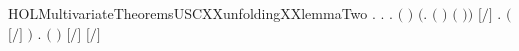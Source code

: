 \begin{SaveVerbatim}{HOLMultivariateTheoremsUSCXXunfoldingXXlemmaTwo}
\HOLTokenTurnstile{} \HOLSymConst{\HOLTokenForall{}}.
         \HOLSymConst{\HOLTokenImp{}}
       \HOLSymConst{\HOLTokenForall{}}.
              \HOLSymConst{\HOLTokenImp{}}
           \HOLSymConst{\HOLTokenForall{}}  .
               \ensuremath{(}  \HOLSymConst{\ensuremath{=}}  \ensuremath{)} \HOLSymConst{\HOLTokenConj{}}   \HOLSymConst{\HOLTokenConj{}}
                \ensuremath{(}\HOLTokenLambda{}.  \ensuremath{(} \ensuremath{)} \ensuremath{(} \ensuremath{)}\ensuremath{)}  \HOLSymConst{\HOLTokenConj{}}
               \ensuremath{[}\ensuremath{/}\ensuremath{]}  \HOLTokenTransBegin{}\HOLTokenTransEnd {} \HOLSymConst{\HOLTokenImp{}}
               \HOLSymConst{\HOLTokenExists{}}.
                      \HOLSymConst{\HOLTokenConj{}} \ensuremath{(} \HOLSymConst{\ensuremath{=}} \ensuremath{[}\ensuremath{/}\ensuremath{]} \ensuremath{)} \HOLSymConst{\HOLTokenConj{}}
                   \HOLSymConst{\HOLTokenForall{}}.
                       \ensuremath{(}  \HOLSymConst{\ensuremath{=}}  \ensuremath{)} \HOLSymConst{\HOLTokenImp{}}
                       \ensuremath{[}\ensuremath{/}\ensuremath{]}  \HOLTokenTransBegin{}\HOLTokenTransEnd \ensuremath{[}\ensuremath{/}\ensuremath{]} 
\end{SaveVerbatim}
\newcommand{\HOLMultivariateTheoremsUSCXXunfoldingXXlemmaTwo}{\UseVerbatim{HOLMultivariateTheoremsUSCXXunfoldingXXlemmaTwo}}
